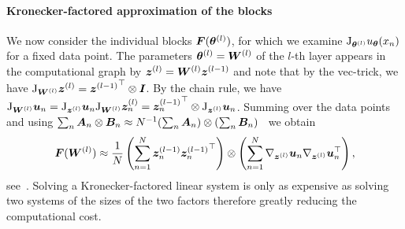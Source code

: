 \paragraph{Kronecker-factored approximation of the blocks}
We now consider the individual blocks ${\bm{F}}({\bm{\theta}}^{(l)})$, for which we examine $\mathrm{J}_{{\bm{\theta}}^{(l)}} u_{{\bm{\theta}}}(x_n)$ for a fixed data point. 
The parameters ${\bm{\theta}}^{(l)} = {\bm{W}}^{(l)}$ of the $l$-th layer appears in the computational graph by ${\bm{z}}^{(l)} = {\bm{W}}^{(l)}{\bm{z}}^{(l-1)}$ and note that by the vec-trick, we have $\mathrm{J}_{{\bm{W}}^{(l)}} {\bm{z}}^{(l)} = {{\bm{z}}^{(l-1)}}^\top \otimes {\bm{I}}$. 
By the chain rule, we have
    $\jac_{\mW^{(l)}} \vu_n%
     = \jac_{\vz^{(l)}}  \vu_n \jac_{\mW^{(l)}} \vz_n^{(l)}%
    = {\vz^{(l-1)}_n}^\top\otimes  \jac_{\vz^{(l)}}  \vu_n$.%
Summing over the data points and using  $\sum_n {\bm{A}}_n \otimes {\bm{B}}_n \approx N^{-1}(\sum_n {\bm{A}}_n) \otimes (\sum_n {\bm{B}}_n)$~\citep{martens2015optimizing} we obtain 
\begin{equation}
    \mF(\mW^{(l)}) %
    \approx \frac1N\left(\sum_{n=1}^N \vz^{(l-1)}_n {\vz^{(l-1)}_n}^\top \right)\otimes \left(\sum_{n=1}^N\nabla_{\vz^{(l)}}  \vu_n\nabla_{\vz^{(l)}}  \vu_n^\top\right),
\end{equation}
see~\citep{eschenhagen2023kroneckerfactored}. 
Solving a Kronecker-factored linear system is only as expensive as solving two systems of the sizes of the two factors therefore greatly reducing the computational cost. 


